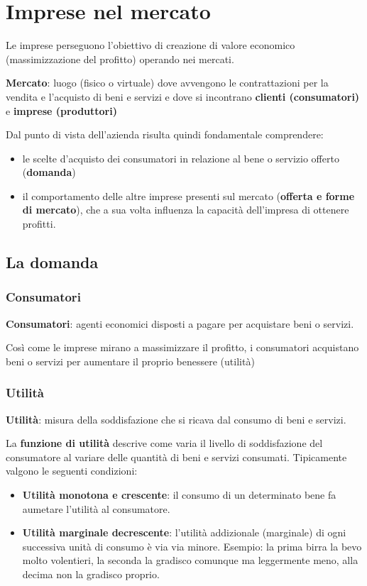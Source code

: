 \documentclass[../main.tex]{subfiles}
\begin{document}
\section{Imprese nel mercato}

Le imprese perseguono l'obiettivo di creazione di valore economico (massimizzazione del profitto) operando nei mercati.

\textbf{Mercato}: luogo (fisico o virtuale) dove avvengono le contrattazioni per la vendita e l'acquisto di beni e servizi e dove si incontrano \textbf{clienti (consumatori)} e \textbf{imprese (produttori)}

Dal punto di vista dell'azienda risulta quindi fondamentale comprendere:
\begin{itemize}
\item le scelte d'acquisto dei consumatori in relazione al bene o servizio offerto (\textbf{domanda})
\item il comportamento delle altre imprese presenti sul mercato (\textbf{offerta e forme di mercato}), che a sua volta influenza la capacità dell'impresa di ottenere profitti.
\end{itemize}

\subsection{La domanda}

\subsubsection{Consumatori}

\textbf{Consumatori}: agenti economici disposti a pagare per acquistare beni o servizi.

Così come le imprese mirano a massimizzare il profitto, i consumatori acquistano beni o servizi per aumentare il proprio benessere (utilità)

\subsubsection{Utilità}

\textbf{Utilità}: misura della soddisfazione che si ricava dal consumo di beni e servizi.

La \textbf{funzione di utilità} descrive come varia il livello di soddisfazione del consumatore al variare delle quantità di beni e servizi consumati. Tipicamente valgono le seguenti condizioni:
\begin{itemize}
\item \textbf{Utilità monotona e crescente}: il consumo di un determinato bene fa aumetare l'utilità al consumatore.
\item \textbf{Utilità marginale decrescente}: l'utilità addizionale (marginale) di ogni successiva unità di consumo è via via minore. Esempio: la prima birra la bevo molto volentieri, la seconda la gradisco comunque ma leggermente meno, alla decima non la gradisco proprio.
\end{itemize}
\end{document}
